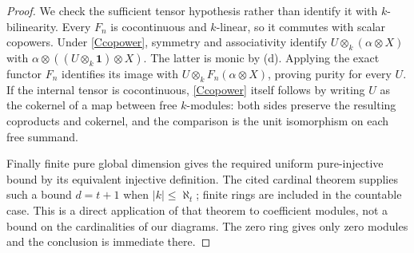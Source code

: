 \begin{proof}
We check the sufficient tensor hypothesis rather than identify it with $k$-bilinearity. Every $F_n$ is cocontinuous and $k$-linear, so it commutes with scalar copowers. Under \eqref{Ccopower}, symmetry and associativity identify $U\otimes_k(\alpha\otimes X)$ with $\alpha\otimes((U\otimes_k\mathbf1)\otimes X)$. The latter is monic by (d). Applying the exact functor $F_n$ identifies its image with $U\otimes_kF_n(\alpha\otimes X)$, proving purity for every $U$. If the internal tensor is cocontinuous, \eqref{Ccopower} itself follows by writing $U$ as the cokernel of a map between free $k$-modules: both sides preserve the resulting coproducts and cokernel, and the comparison is the unit isomorphism on each free summand.

Finally finite pure global dimension gives the required uniform pure-injective bound by its equivalent injective definition. The cited cardinal theorem supplies such a bound $d=t+1$ when $|k|\leq\aleph_t$; finite rings are included in the countable case. This is a direct application of that theorem to coefficient modules, not a bound on the cardinalities of our diagrams. The zero ring gives only zero modules and the conclusion is immediate there.
\end{proof}

